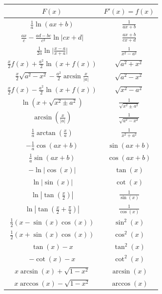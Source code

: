 \begin{center}
        \begin{tabular}{c||c}
                $F(x)$ & $F'(x) = f(x)$ \\
                \hline \hline
                
                $ \frac{1}{a} \ln (ax+b) $  &  $ \frac{1}{ax+b}$ \\
                $ \frac{ax}{c}-\frac{ad-bc}{c^2} \ln |cx+d| $  &  $ \frac{ax+b}{cx+d} $ \\
                $ \frac{1}{2a} \ln { \big| \frac{x-a}{x+a} \big| } $  &  $ \frac{1}{x^2-a^2} $ \\
                $ \frac{x}{2} f(x) + \frac{a^2}{2} \ln ( x+f(x) ) $  &  $ \sqrt{a^2+x^2} $ \\
                $ \frac{x}{2} \sqrt{a^2-x^2} - \frac{a^2}{2} \arcsin \frac{x}{|a|} $  &  $ \sqrt{a^2-x^2} $ \\
                $ \frac{x}{2} f(x) - \frac{a^2}{2} \ln {( x+f(x) )} $  &  $ \sqrt{x^2-a^2} $ \\
                $ \ln(x+\sqrt{x^2 \pm a^2}) $  &  $ \frac{1}{\sqrt{x^2 \pm  a^2}} $ \\
                $ \arcsin( \frac{x}{|a|}) $  &  $ \frac{1}{\sqrt{a^2-x^2}} $ \\
                $ \frac{1}{a} \arctan(\frac{x}{a}) $  &  $ \frac{1}{x^2+a^2} $ \\
                $ -\frac{1}{a}\cos(ax+b) $  &  $ \sin(ax+b) $ \\
                $ \frac{1}{a}\sin(ax+b) $  &  $ \cos(ax+b) $ \\
                $ -\ln|\cos(x)| $  &  $ \tan(x) $ \\
                $ \ln |\sin(x)| $  &  $ \cot(x) $ \\
                $ \ln \left|\tan(\frac{x}{2})\right| $  &  $ \frac{1}{\sin(x)} $ \\
                $ \ln \left|\tan(\frac{x}{2}+\frac{\pi}{4})\right| $  &  $ \frac{1}{\cos(x)} $ \\
                $ \frac{1}{2} (x-\sin(x)\cos(x)) $  &  $ \sin^2(x) $ \\
                $ \frac{1}{2} (x+\sin(x)\cos(x)) $  &  $ \cos^2(x) $ \\
                $ \tan(x)-x $  &  $ \tan^2(x) $ \\
                $ -\cot(x)-x $  &  $ \cot^2(x) $ \\
                $ x \arcsin(x) + \sqrt{1-x^2} $  &  $ \arcsin(x) $ \\
                $ x \arccos(x) - \sqrt{1-x^2} $  &  $ \arccos(x) $ \\

\end{tabular}
\end{center}
